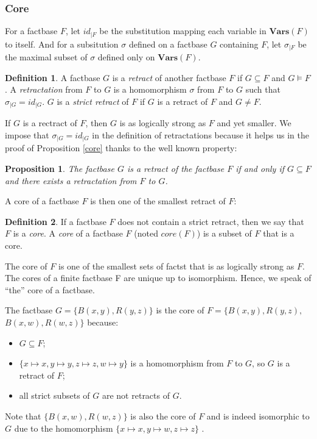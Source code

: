 \documentclass{article}
\newtheorem{proposition}{Proposition}[section]
\theoremstyle{definition}
\newtheorem{definition}{Definition}[section]
\theoremstyle{remark}
\newcommand{\Vars}{\textbf{Vars}}
\begin{document}
\subsubsection{Core}

For a factbase $F$, let $id_{|F}$ be the substitution mapping each variable in $\Vars(F)$ to itself. And for a subsitution $\sigma$ defined on a factbase $G$ containing $F$, let $\sigma_{|F}$ be the maximal subset of $\sigma$ defined only on $\Vars(F)$. 

\begin{definition}
A factbase $G$ is a \emph{retract} of another factbase $F$ if $G \subseteq F$ and $G \models F$. A \emph{retractation} from $F$ to $G$ is a homomorphism $\sigma$ from $F$ to $G$ such that $\sigma_{|G}=id_{|G}$. $G$ is a \emph{strict retract} of $F$ if $G$ is a retract of $F$ and $G \neq F$.
\end{definition}

If $G$ is a rectract of $F$, then $G$ is as logically strong as $F$ and yet smaller. We impose that $\sigma_{|G}=id_{|G}$ in the definition of retractations because it helps us in the proof of Proposition \ref{core} thanks to the well known property:


\begin{proposition} \label{retract}
The factbase $G$ is a retract of the factbase $F$ if and only if $G \subseteq F$  and there exists a retractation from $F$ to $G$.
\end{proposition}

A core of a factbase $F$ is then one of the smallest retract of $F$:

\begin{definition}
If a factbase $F$ does not contain a strict retract, then we say that $F$ is a \emph{core}. A \emph{core} of a factbase $F$ (noted \emph{$\textit{core}(F)$}) is a subset of $F$ that is a core.
\end{definition}

The core of $F$ is one of the smallest sets of factst that is as logically strong as $F$. The cores of a finite factbase F are unique up to isomorphism. Hence, we speak of ``the'' core of a factbase.

The factbase $G = \{B(x,y),R(y,z)\}$ is the core of $F = \{B(x,y),R(y,z),$ $B(x,w),R(w,z)\}$ because:
\begin{itemize}
\item $G \subseteq F$;
\item $\{x \mapsto x, y \mapsto y, z \mapsto z, w \mapsto y\}$ is a homomorphism from $F$ to $G$, so $G$ is a retract of $F$;
\item all strict subsets of $G$ are not retracts of $G$.
\end{itemize}
Note that $ \{B(x,w),R(w,z)\}$ is also the core of $F$ and is indeed isomorphic to $G$ due to the homomorphism $\{x \mapsto x, y \mapsto w, z \mapsto z\}$ .
\end{document}
